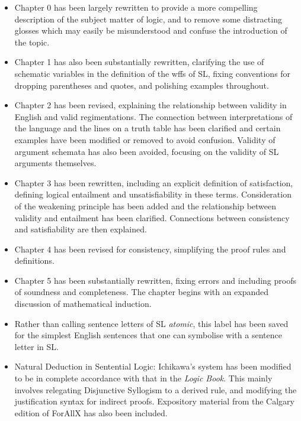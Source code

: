 \begin{itemize}

\item Chapter 0 has been largely rewritten to provide a more compelling description of the subject matter of logic, and to remove some distracting glosses which may easily be misunderstood and confuse the introduction of the topic.

\item Chapter 1 has also been substantially rewritten, clarifying the use of schematic variables in the definition of the wffs of SL, fixing conventions for dropping parentheses and quotes, and polishing examples throughout.

\item Chapter 2 has been revised, explaining the relationship between validity in English and valid regimentations. The connection between interpretations of the language and the lines on a truth table has been clarified and certain examples have been modified or removed to avoid confusion. Validity of argument schemata has also been avoided, focusing on the validity of SL arguments themselves.

\item Chapter 3 has been rewritten, including an explicit definition of satisfaction, defining logical entailment and unsatisfiability in these terms. Consideration of the weakening principle has been added and the relationship between validity and entailment has been clarified. Connections between consistency and satisfiability are then explained.

\item Chapter 4 has been revised for consistency, simplifying the proof rules and definitions.

\item Chapter 5 has been substantially rewritten, fixing errors and including proofs of soundness and completeness. The chapter begins with an expanded discussion of mathematical induction.

\item Rather than calling sentence letters of SL \textit{atomic}, this label has been saved for the simplest English sentences that one can symbolise with a sentence letter in SL.

\item Natural Deduction in Sentential Logic: Ichikawa's system has been modified to be in complete accordance with that in the \textit{Logic Book}.
  This mainly involves relegating Disjunctive Syllogism to a derived rule, and modifying the justification syntax for indirect proofs.
  Expository material from the Calgary edition of ForAllX has also been included.


\end{itemize}

